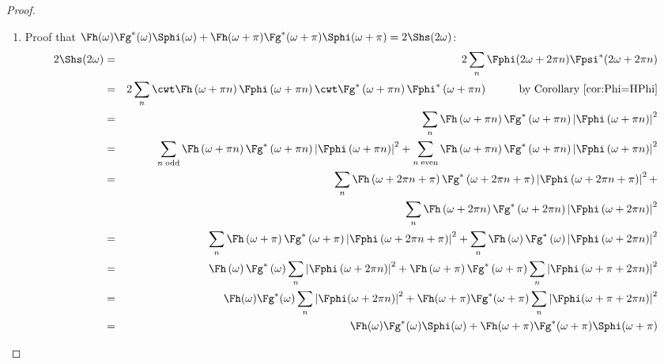\begin{proof}
\begin{enumerate}
\item Proof that
   $
   \Fh(\omega     ) \Fg^\ast(\omega     )\Sphi(\omega)  +
   \Fh(\omega +\pi) \Fg^\ast(\omega +\pi)\Sphi(\omega+\pi)
   = 2\Shs(2\omega)
   $:
\begin{eqnarray*}
  2\Shs(2\omega)
    &=& 2\sum_n \Fphi(2\omega+2\pi n) \Fpsi^\ast(2\omega+2\pi n)
  \\&=& 2\sum_n
        \cwt 
        \Fh  \left(\omega +\pi n \right)
        \Fphi\left(\omega +\pi n \right)
        \cwt 
        \Fg^\ast  \left(\omega +\pi n \right)
        \Fphi^\ast\left(\omega +\pi n \right)
        \hspace{1cm}\text{by Corollary~\ref{cor:Phi=HPhi}}
  \\&=& \sum_n
        \Fh  \left(\omega +\pi n \right)
        \Fg^\ast  \left(\omega +\pi n \right)
        \left| \Fphi\left(\omega +\pi n \right) \right|^2
  \\&=& \sum_{n\mathrm{\;odd}}
        \Fh  \left(\omega +\pi n \right)
        \Fg^\ast  \left(\omega +\pi n \right)
        \left| \Fphi\left(\omega +\pi n \right) \right|^2
      + \sum_{n\mathrm{\;even}}
        \Fh  \left(\omega +\pi n \right)
        \Fg^\ast  \left(\omega +\pi n \right)
        \left| \Fphi\left(\omega +\pi n \right) \right|^2
  \\&=& \sum_n
        \Fh  \left(\omega +2\pi n+\pi \right)
        \Fg^\ast  \left(\omega +2\pi n+\pi \right)
        \left| \Fphi\left(\omega +2\pi n+\pi \right) \right|^2
      + \\&& \sum_n
        \Fh  \left(\omega +2\pi n\right)
        \Fg^\ast  \left(\omega +2\pi n\right)
        \left| \Fphi\left(\omega +2\pi n\right) \right|^2
  \\&=& \sum_n
        \Fh  \left(\omega +\pi \right)
        \Fg^\ast  \left(\omega +\pi \right)
        \left| \Fphi\left(\omega +2\pi n+\pi \right) \right|^2
      + \sum_n
        \Fh  \left(\omega \right)
        \Fg^\ast  \left(\omega \right)
        \left| \Fphi\left(\omega +2\pi n\right) \right|^2
  \\&=& \Fh  \left(\omega \right)
        \Fg^\ast  \left(\omega \right)
        \sum_n \left| \Fphi\left(\omega +2\pi n\right) \right|^2
      + \Fh  \left(\omega +\pi \right)
        \Fg^\ast  \left(\omega +\pi \right)
        \sum_n\left| \Fphi\left(\omega +\pi+2\pi n\right) \right|^2
  \\&=& \Fh(\omega)
        \Fg^\ast(\omega)
        \sum_n \left| \Fphi(\omega +2\pi n) \right|^2
      + \Fh  (\omega +\pi)
        \Fg^\ast (\omega +\pi)
        \sum_n\left| \Fphi(\omega +\pi+2\pi n) \right|^2
  \\&=& \Fh(\omega     ) \Fg^\ast(\omega     )\Sphi(\omega)
      + \Fh(\omega +\pi) \Fg^\ast(\omega +\pi)\Sphi(\omega+\pi)
\end{eqnarray*}

\end{enumerate}
\end{proof}








